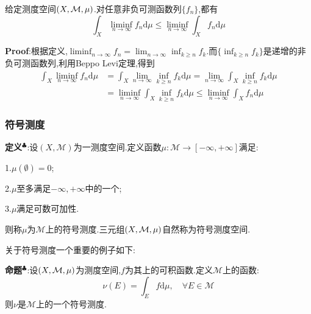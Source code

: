 \begin{tcolorbox}[colback=KuangNei,colframe=BianKuang,title=\textbf{Fatou引理},sharpish corners]
    给定测度空间$(X,\mathcal{M},\mu)$.对任意非负可测函数列$\{f_n\}$,都有
    $$
    \int_{X}\liminf_{n\to\infty}f_n\mathrm{d}\mu\leqslant \liminf_{n\to\infty}\int_{X}f_n\mathrm{d}\mu
    $$
\end{tcolorbox}
\textbf{Proof}:根据定义,$\liminf_{n\to\infty}f_n=\lim_{n\to\infty}\inf_{k\geqslant n}f_k$.而$\{\inf_{k\geqslant n}f_k\}$是递增的非负可测函数列,利用Beppo Levi定理,得到
$$
\begin{aligned}
    \int_{X}\liminf_{n\to\infty}f_n\mathrm{d}\mu &= \int_{X}\lim_{n\to\infty}\inf_{k\geqslant n}f_k\mathrm{d}\mu=\lim_{n\to\infty}\int_{X}\inf_{k\geqslant n}f_k\mathrm{d}\mu\\
                                                 &= \liminf_{n\to\infty}\int_{X}\inf_{k\geqslant n}f_k\mathrm{d}\mu\leqslant\liminf_{n\to\infty}\int_{X}f_n\mathrm{d}\mu 
\end{aligned}
$$
\subsubsection{符号测度}
\textbf{定义}$^\clubsuit $:设$(X,\mathcal{M})$为一测度空间.定义函数$\mu:\mathcal{M}\to [-\infty,+\infty]$满足:\par
1.$\mu(\emptyset)=0$;\par
2.$\mu$至多满足$-\infty,+\infty$中的一个;\par
3.$\mu$满足可数可加性.\par
则称$\mu$为$\mathcal{M}$上的符号测度.三元组$(X,\mathcal{M},\mu)$自然称为符号测度空间.\par
关于符号测度一个重要的例子如下:\par
\textbf{命题}$^\clubsuit $:设$(X,\mathcal{M},\mu)$为测度空间,$f$为其上的可积函数.定义$\mathcal{M}$上的函数:
$$
\nu (E)=\int_{E}f\mathrm{d}\mu,\quad \forall E\in\mathcal{M}
$$
则$\nu$是$\mathcal{M}$上的一个符号测度.